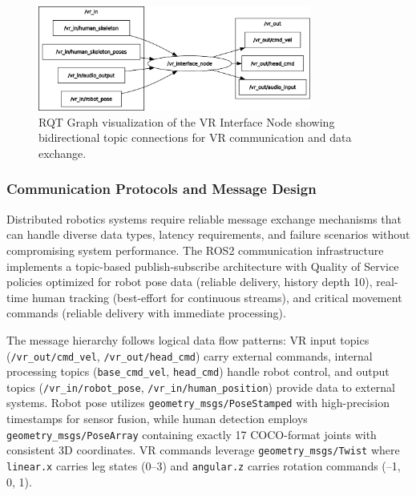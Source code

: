 \begin{figure}[H]
    \centering
    \includegraphics[width=0.8\textwidth]{Images/vrnode.png}
    \caption{RQT Graph visualization of the VR Interface Node showing bidirectional topic connections for VR communication and data exchange.}
    \label{fig:rqt_vr_interface_node}
\end{figure}

\subsubsection{Communication Protocols and Message Design}

Distributed robotics systems require reliable message exchange mechanisms that can handle diverse data types, latency requirements, and failure scenarios without compromising system performance. The ROS2 communication infrastructure implements a topic-based publish-subscribe architecture with Quality of Service policies optimized for robot pose data (reliable delivery, history depth 10), real-time human tracking (best-effort for continuous streams), and critical movement commands (reliable delivery with immediate processing).

The message hierarchy follows logical data flow patterns: VR input topics \linebreak(\texttt{/vr\_out/cmd\_vel}, \texttt{/vr\_out/head\_cmd}) carry external commands, internal processing topics (\texttt{base\_cmd\_vel}, \texttt{head\_cmd}) handle robot control, and output topics \linebreak(\texttt{/vr\_in/robot\_pose}, \texttt{/vr\_in/human\_position}) provide data to external systems. Robot pose utilizes \texttt{geometry\_msgs/PoseStamped} with high-precision timestamps for sensor fusion, while human detection employs \texttt{geometry\_msgs/PoseArray} containing exactly 17 COCO-format joints with consistent 3D coordinates. VR commands leverage \linebreak\texttt{geometry\_msgs/Twist} where \texttt{linear.x} carries leg states (0--3) and \texttt{angular.z} carries rotation commands (--1, 0, 1).

